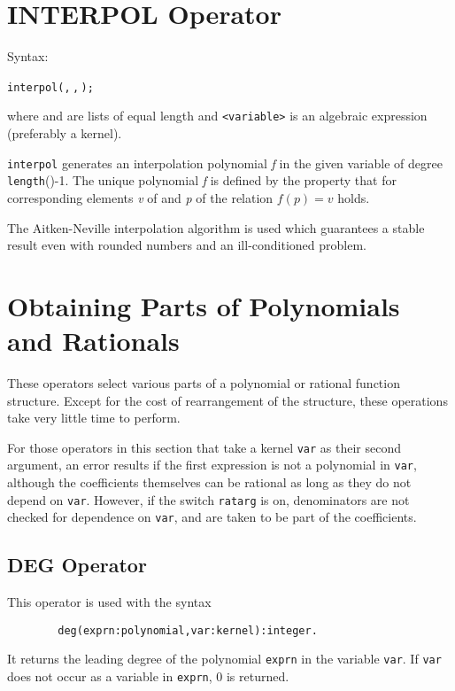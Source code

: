 \section{INTERPOL Operator}
\hypertarget{operator:INTERPOL}{}

Syntax:
\begin{syntax}
  \texttt{interpol(}\texttt{,}\,\texttt{,}\,\texttt{);}
\end{syntax}

where  and  are lists of equal length and
\texttt{<variable>} is an algebraic expression (preferably a kernel).

\texttt{interpol} generates an interpolation polynomial \emph{f} in the given
variable of degree \texttt{length}()-1.  The unique polynomial
\emph{f}
is defined by the property that for corresponding elements \emph{v} of
 and \emph{p} of  the relation $f(p)=v$ holds.

The Aitken-Neville interpolation algorithm is used which guarantees a
stable result even with rounded numbers and an ill-conditioned problem.

\section{Obtaining Parts of Polynomials and Rationals}

These operators select various parts of a polynomial or rational function
structure. Except for the cost of rearrangement of the structure, these
operations take very little time to perform.

For those operators in this section that take a kernel \texttt{var} as their
second argument, an error results if the first expression is not a
polynomial in \texttt{var}, although the coefficients themselves can be
rational as long as they do not depend on \texttt{var}.  However, if the
switch \texttt{ratarg} is on, denominators are not checked
for dependence on \texttt{var}, and are taken to be part of the coefficients.

\subsection{DEG Operator}
\hypertarget{operator:DEG}{}

This operator is used with the syntax
\begin{verbatim}
        deg(exprn:polynomial,var:kernel):integer.
\end{verbatim}
It returns the leading degree of the polynomial \texttt{exprn}
in the variable \texttt{var}.  If \texttt{var} does not occur as a variable in
\texttt{exprn}, 0 is returned.

